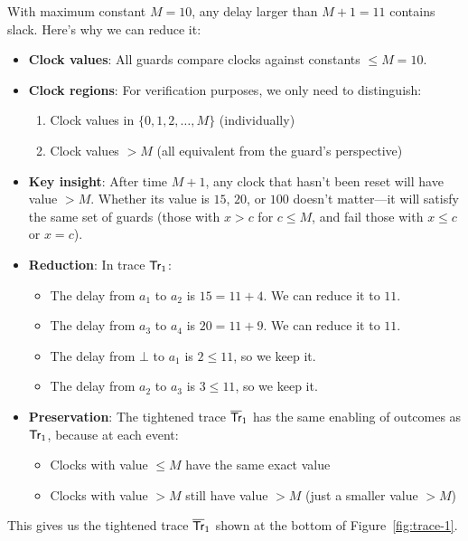 With maximum constant $M = 10$, any delay larger than $M+1 = 11$ contains slack. Here's why we can reduce it:

\begin{itemize}
\item \textbf{Clock values}: All guards compare clocks against constants $\leq M = 10$. 

\item \textbf{Clock regions}: For verification purposes, we only need to distinguish:
  \begin{enumerate}
  \item Clock values in $\{0, 1, 2, \ldots, M\}$ (individually)
  \item Clock values $ > M$ (all equivalent from the guard's perspective)
  \end{enumerate}

\item \textbf{Key insight}: After time $M+1$, any clock that hasn't been reset will have value $> M$. Whether its value is $15$, $20$, or $100$ doesn't matter---it will satisfy the same set of guards (those with $x > c$ for $c \leq M$, and fail those with $x \leq c$ or $x = c$).

\item \textbf{Reduction}: In trace $\textsf{Tr}_1$:
  \begin{itemize}
  \item The delay from $a_1$ to $a_2$ is $15 = 11 + 4$. We can reduce it to $11$.
  \item The delay from $a_3$ to $a_4$ is $20 = 11 + 9$. We can reduce it to $11$.
  \item The delay from $\bot$ to $a_1$ is $2 \leq 11$, so we keep it.
  \item The delay from $a_2$ to $a_3$ is $3 \leq 11$, so we keep it.
  \end{itemize}

\item \textbf{Preservation}: The tightened trace $\overline{\textsf{Tr}}_1$ has the same enabling of outcomes as $\textsf{Tr}_1$, because at each event:
  \begin{itemize}
  \item Clocks with value $\leq M$ have the same exact value
  \item Clocks with value $> M$ still have value $> M$ (just a smaller value $> M$)
  \end{itemize}
\end{itemize}

This gives us the tightened trace $\overline{\textsf{Tr}}_1$ shown at the bottom of Figure~\ref{fig:trace-1}.

